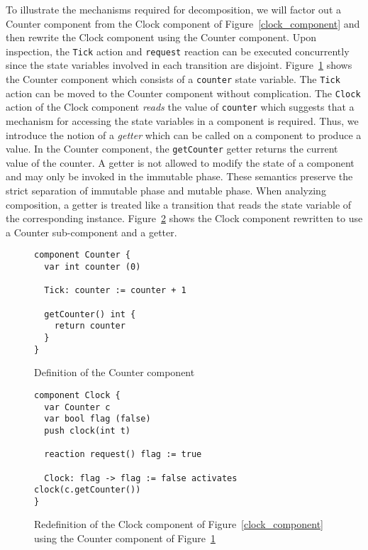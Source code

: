 To illustrate the mechanisms required for decomposition, we will factor out a Counter component from the Clock component of Figure~\ref{clock_component} and then rewrite the Clock component using the Counter component.
Upon inspection, the \verb+Tick+ action and \verb+request+ reaction can be executed concurrently since the state variables involved in each transition are disjoint.
Figure~\ref{counter_component} shows the Counter component which consists of a \verb+counter+ state variable.
The \verb+Tick+ action can be moved to the Counter component without complication.
The \verb+Clock+ action of the Clock component \emph{reads} the value of \verb+counter+ which suggests that a mechanism for accessing the state variables in a component is required.
Thus, we introduce the notion of a \emph{getter} which can be called on a component to produce a value.
In the Counter component, the \verb+getCounter+ getter returns the current value of the counter.
A getter is not allowed to modify the state of a component and may only be invoked in the immutable phase.
These semantics preserve the strict separation of immutable phase and mutable phase.
When analyzing composition, a getter is treated like a transition that reads the state variable of the corresponding instance.
Figure~\ref{factored_clock_component} shows the Clock component rewritten to use a Counter sub-component and a getter.

\begin{figure}
\begin{verbatim}
component Counter {
  var int counter (0)

  Tick: counter := counter + 1

  getCounter() int {
    return counter
  }
}
\end{verbatim}
\caption{Definition of the Counter component}
\label{counter_component}
\end{figure}

\begin{figure}
\begin{verbatim}
component Clock {
  var Counter c
  var bool flag (false)
  push clock(int t)

  reaction request() flag := true

  Clock: flag -> flag := false activates clock(c.getCounter())
}
\end{verbatim}
\caption{Redefinition of the Clock component of Figure~\ref{clock_component} using the Counter component of Figure~\ref{counter_component}}
\label{factored_clock_component}
\end{figure}

